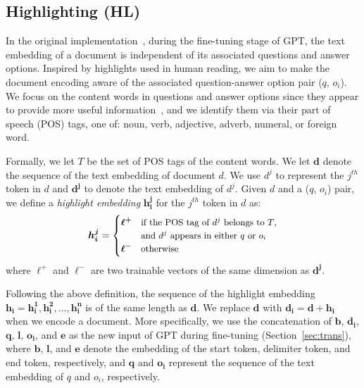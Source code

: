 \documentclass[11pt,a4paper]{article}
\begin{document}
\subsection{Highlighting (HL)}
\label{sec:hl}
In the original implementation~\cite{radfordimproving}, during the fine-tuning stage of GPT, the text embedding of a document is independent of its associated questions and answer options. Inspired by highlights used in human reading, we aim to make the document encoding aware of the associated question-answer option pair ($q$, $o_i$). We focus on the content words in questions and answer options since they appear to provide more useful information~\cite{mirza2013ccg}, and we
identify them via their part of speech (POS) tags, one of: noun, verb, adjective, adverb, numeral, or foreign word.


Formally, we let $T$ be the set of POS tags of the content words. We let $\bm{d}$ denote the
sequence of the
text embedding of document $d$. We use $d^j$ to represent the $j^{th}$ token in $d$ and $\bm{d^j}$ to denote the text embedding of $d^j$. Given $d$ and a ($q$, $o_i$) pair, we define a \emph{highlight embedding} $\bm{h_i^j}$ for the $j^{th}$ token in $d$ as: 
\begin{equation}
\small
\bm{h_i^j} =
\begin{cases}
 \bm{\ell^{+}} &\text{if the POS tag of $d^j$ belongs to $T$,}   \\
 & \text{and $d^j$ appears in either $q$ or $o_i$}\\
 \bm{\ell^{-}} &\text{otherwise}
\end{cases} 
\label{eq:hi}
\end{equation}
\noindent where $\bm{\ell^{+}}$ and $\bm{\ell^{-}}$ are two trainable vectors of the same dimension as $\bm{d^j}$.

Following the above definition, the sequence of the highlight embedding $\bm{h_i}=\bm{h_i^1}, \bm{h_i^2}, \ldots, \bm{h_i^n}$ is of the same length as $\bm{d}$. We replace $\bm{d}$ with $\bm{d_i} = \bm{d} + \bm{h_i}$ when we encode a document. More specifically, we use the concatenation of $\bm{b}$, $\bm{d_i}$, $\bm{q}$, $\bm{l}$, $\bm{o_i}$, and $\bm{e}$ as the new input of GPT during fine-tuning (Section~\ref{sec:trans}), where $\bm{b}$, $\bm{l}$, and $\bm{e}$ denote the embedding of the start token, delimiter token, and end token, respectively, and $\bm{q}$ and $\bm{o_i}$ represent the sequence of the text embedding of $q$ and $o_i$, respectively.
\end{document}

